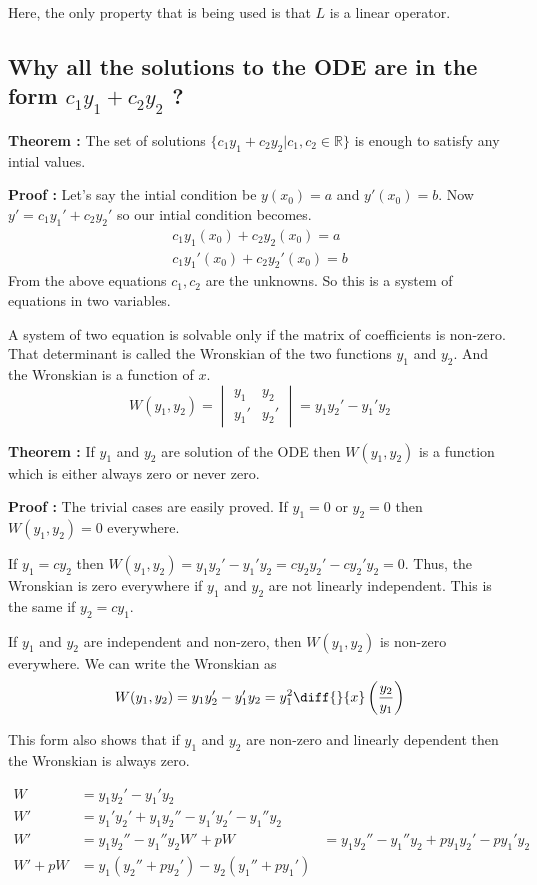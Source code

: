 Here, the only property that is being used is that $L$ is a linear operator. 

\subsection{Why all the solutions to the ODE are in the form $c_1 y_1 + c_2 y_2$ ? }

{\bf Theorem : } The set of solutions $\{ c_1 y_1 + c_2 y_2 | c_1, c_2 \in \mathbb{R} \}$ is enough to satisfy any intial values.

{\bf Proof : } Let's say the intial condition be $y(x_0) = a$ and $y'(x_0) = b$.
Now $y' = c_1 y_1' + c_2 y_2'$ so our intial condition becomes.
\begin{gather*}
	c_1 y_1(x_0) + c_2 y_2(x_0) = a \\
	c_1 y_1'(x_0) + c_2 y_2'(x_0) = b 
\end{gather*}
From the above equations $c_1, c_2$ are the unknowns.
So this is a system of equations in two variables.

A system of two equation is solvable only if the matrix of coefficients is non-zero.
That determinant is called the Wronskian of the two functions $y_1$ and $y_2$.
And the Wronskian is a function of $x$.
$$
W(y_1, y_2) = 
\begin{vmatrix*}
	y_1 & y_2 \\
	y_1' & y_2' 
\end{vmatrix*}
	= y_1 y_2' - y_1' y_2
$$

{\bf Theorem : } If $y_1$ and $y_2$ are solution of the ODE then
$W(y_1, y_2)$ is a function which is either always zero or never zero.

{\bf Proof : } The trivial cases are easily proved.
If $y_1 = 0$ or $y_2 = 0$ then $W(y_1, y_2) = 0$ everywhere.

If $y_1 = cy_2$ then $W(y_1, y_2) = y_1 y_2' - y_1' y_2 = c y_2 y_2' - c y_2' y_2 = 0$.
Thus, the Wronskian is zero everywhere if $y_1$ and $y_2$ are not linearly independent.
This is the same if $y_2 = cy_1$.

If $y_1$ and $y_2$ are independent and non-zero, then $W(y_1, y_2)$ is non-zero everywhere.
We can write the Wronskian as 
$$ 
W(y_1, y_2) 
	= y_1 y_2' - y_1' y_2 
	= y_1^2 \diff{}{x} \left( \frac{y_2}{y_1} \right) 
$$

This form also shows that if $y_1$ and $y_2$ are non-zero and linearly dependent then the Wronskian is always zero.

\begin{align*}
	W & = y_1 y_2' - y_1' y_2 \\
	W' & = y_1' y_2' + y_1 y_2'' - y_1' y_2' - y_1'' y_2 \\
	W' & = y_1 y_2'' - y_1'' y_2
	W' + pW & = y_1 y_2'' - y_1'' y_2 + p y_1 y_2' - p y_1' y_2 \\
	W' + pW & = y_1 (y_2'' + p y_2') - y_2( y_1'' + p y_1' )
\end{align*}

